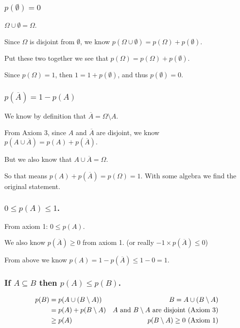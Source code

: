 \subsubsection{$p(\emptyset) = 0$}
$\Omega \cup \emptyset = \Omega$. 

Since $\Omega$ is disjoint from $\emptyset$, 
we know $p(\Omega\cup\emptyset) = p(\Omega) + p(\emptyset)$. 

Put these two together we see that 
$p(\Omega) = p(\Omega) + p(\emptyset)$. 

Since $p(\Omega)=1$, 
then $1 = 1 + p(\emptyset)$, 
and thus $p(\emptyset) = 0$. 

\subsubsection{$p(\overline{A}) = 1-p(A)$}
We know by definition that $\overline{A} = \Omega \setminus A$. 

From Axiom 3, since $A$ and $\overline{A}$ are disjoint, 
we know $p(A\cup\overline{A}) = p(A) + p(\overline{A})$.

But we also know that $A\cup\overline{A} = \Omega$. 

So that means $ p(A) + p(\overline{A}) = p(\Omega) = 1$. 
With some algebra we find the original statement. 

\subsubsection{$0 \le p(A) \le 1$.}

From axiom 1: $0 \le p(A)$. 

We also know $p(\overline{A})\ge 0$ from axiom 1. (or really  $-1\times p(\overline{A})\le 0$)

From above we know $p(A) = 1-p(\overline{A}) \le 1-0 = 1$.

\subsubsection{If $A\subseteq B$ then $p(A) \le p(B)$.}

\begin{align*}
p(B) & = p(A \cup (B\setminus A)) &			B = A \cup (B\setminus A)\\
	&= p(A) + p(B\setminus A) & A \textnormal{ and } B\setminus A \textnormal{ are disjoint (Axiom 3)} \\
	&\ge p(A) 				& p(B\setminus A) \ge 0 \textnormal{ (Axiom 1)} \\
\end{align*}

